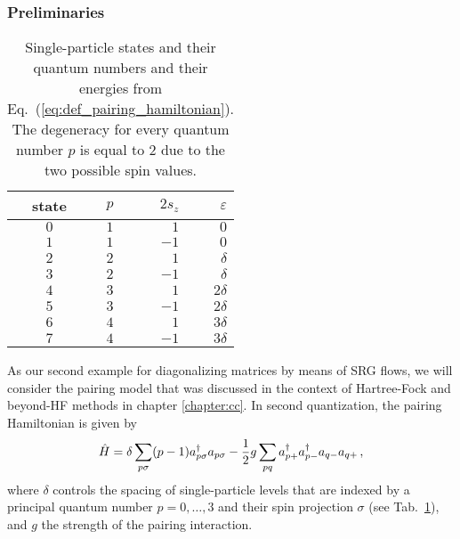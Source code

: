 {%
%
\subsubsection{Preliminaries}
\begin{table}[t]
  \begin{center}
      \begin{tabular*}{0.25\textwidth}{@{\extracolsep\fill}|c|c|r|r|}
      \hline 
      state & $p$ & $2s_z$ & $\varepsilon$
      \\ \hline 
      $0$ & $1$ & $ 1$ & $     0 $ \\ 
      $1$ & $1$ & $-1$ & $     0 $ \\ 
      $2$ & $2$ & $ 1$ & $ \delta$ \\ 
      $3$ & $2$ & $-1$ & $ \delta$ \\ 
      $4$ & $3$ & $ 1$ & $2\delta$ \\ 
      $5$ & $3$ & $-1$ & $2\delta$ \\ 
      $6$ & $4$ & $ 1$ & $3\delta$ \\ 
      $7$ & $4$ & $-1$ & $3\delta$ \\ \hline
      \end{tabular*}
  \end{center}
  \caption{\label{tab:srg_pairing_sp}Single-particle states and their quantum numbers and their energies from Eq.~(\ref{eq:def_pairing_hamiltonian}). The degeneracy for every quantum number $p$ is equal to 2 due to the two possible spin values.} 
\end{table}

As our second example for diagonalizing matrices by means of SRG flows, we will
consider the pairing model that was discussed in the context of Hartree-Fock and
beyond-HF methods in chapter \ref{chapter:cc}. In second quantization, the 
pairing Hamiltonian is given by
\begin{equation}\label{eq:def_pairing_hamiltonian}
  \HO = \delta \sum_{p \sigma} (p-1) a^{\dagger}_{p \sigma} a_{p\sigma}
        -\frac{1}{2}g \sum_{pq} a^{\dagger}_{p+}a^{\dagger}_{p-}a_{q-}a_{q+}\,,
\end{equation}
where $\delta$ controls the spacing of single-particle levels that are indexed
by a principal quantum number $p=0,\ldots,3$ and their spin projection $\sigma$ (see 
Tab.~\ref{tab:srg_pairing_sp}), and $g$ the strength of the pairing interaction. 

}
